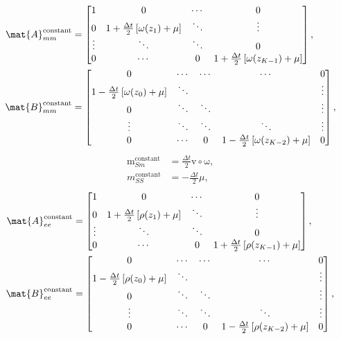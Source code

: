 \documentclass{jpmarticle}
\renewcommand{\vec}[1]{\boldsymbol{\mathrm{#1}}}
\begin{document}
\begin{equation}
  \begin{split}
    \mat{A}_{mm}^{\text{constant}} &=
    \begin{bmatrix}
      1 & 0 & \cdots & 0
      \\
      0 & 1 + \frac{\Delta t}{2} \left[\omega(z_1) + \mu\right] &
      \ddots & \vdots
      \\
      \vdots & \ddots & \ddots & 0
      \\
      0 & \cdots & 0 &
      1 + \frac{\Delta t}{2} \left[\omega(z_{K - 1}) + \mu\right]
    \end{bmatrix},
    \\
    \mat{B}_{mm}^{\text{constant}} &=
    \begin{bmatrix}
      0 & \cdots & \cdots & \cdots & 0
      \\
      1 - \frac{\Delta t}{2} \left[\omega(z_0) + \mu\right] & \ddots &
      & & \vdots
      \\
      0 & \ddots & \ddots & & \vdots
      \\
      \vdots & \ddots & \ddots & \ddots & \vdots
      \\
      0 & \cdots & 0 &
      1 - \frac{\Delta t}{2} \left[\omega(z_{K - 2}) + \mu\right] & 0
    \end{bmatrix},
  \end{split}
\end{equation}
\begin{equation}
  \begin{split}
    \vec{m}_{Sm}^{\text{constant}} &=
    \frac{\Delta t}{2} \vec{v} \circ \vec{\omega},
    \\
    m_{SS}^{\text{constant}} &= - \frac{\Delta t}{2} \mu,
  \end{split}
\end{equation}
\begin{equation}
  \begin{split}
    \mat{A}_{ee}^{\text{constant}} &=
    \begin{bmatrix}
      1 & 0 & \cdots & 0
      \\
      0 & 1 + \frac{\Delta t}{2} \left[\rho(z_1) + \mu\right] &
      \ddots & \vdots
      \\
      \vdots & \ddots & \ddots & 0
      \\
      0 & \cdots & 0 &
      1 + \frac{\Delta t}{2} \left[\rho(z_{K - 1}) + \mu\right]
    \end{bmatrix},
    \\
    \mat{B}_{ee}^{\text{constant}} &=
    \begin{bmatrix}
      0 & \cdots & \cdots & \cdots & 0
      \\
      1 - \frac{\Delta t}{2} \left[\rho(z_0) + \mu\right] & \ddots &
      & & \vdots
      \\
      0 & \ddots & \ddots & & \vdots
      \\
      \vdots & \ddots & \ddots & \ddots & \vdots
      \\
      0 & \cdots & 0 &
      1 - \frac{\Delta t}{2} \left[\rho(z_{K - 2}) + \mu\right] & 0
    \end{bmatrix},
  \end{split}
\end{equation}
\end{document}
